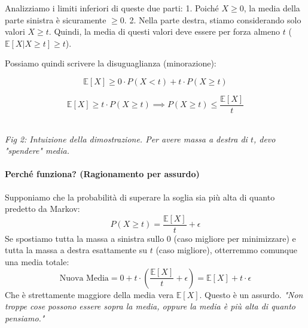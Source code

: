 Analizziamo i limiti inferiori di queste due parti:
1. Poiché $X \ge 0$, la media della parte sinistra è sicuramente $\ge 0$.
2. Nella parte destra, stiamo considerando solo valori $X \ge t$. Quindi, la media di questi valori deve essere per forza almeno $t$ ($\mathbb{E}[X | X \ge t] \ge t$).

Possiamo quindi scrivere la disuguaglianza (minorazione):

\[
\mathbb{E}[X] \ge 0 \cdot P(X < t) + t \cdot P(X \ge t)
\]

\[
\mathbb{E}[X] \ge t \cdot P(X \ge t) \implies P(X \ge t) \le \frac{\mathbb{E}[X]}{t}
\]

\begin{center}
\\ \textit{Fig 2: Intuizione della dimostrazione. Per avere massa a destra di $t$, devo "spendere" media.}
\end{center}

\paragraph{Perché funziona? (Ragionamento per assurdo)}
Supponiamo che la probabilità di superare la soglia sia più alta di quanto predetto da Markov:
\[ P(X \ge t) = \frac{\mathbb{E}[X]}{t} + \epsilon \]
Se spostiamo tutta la massa a sinistra sullo 0 (caso migliore per minimizzare) e tutta la massa a destra esattamente su $t$ (caso migliore), otterremmo comunque una media totale:
\[ \text{Nuova Media} = 0 + t \cdot \left(\frac{\mathbb{E}[X]}{t} + \epsilon\right) = \mathbb{E}[X] + t\cdot\epsilon \]
Che è strettamente maggiore della media vera $\mathbb{E}[X]$. Questo è un assurdo. 
\textit{"Non troppe cose possono essere sopra la media, oppure la media è più alta di quanto pensiamo."}

